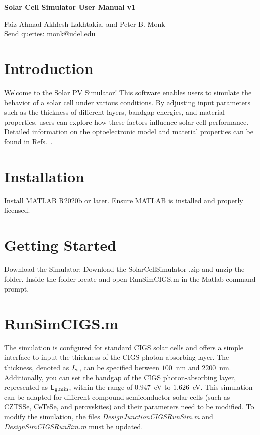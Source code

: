 \documentclass[10pt]{article}
\def\Ls{L_{\rm s}}
\def\sfE{{\sf E}}
\def\ego{\sfE_{\rm g,min}}
\def\Ls{L_{\rm s}}
\def\sfE{{\sf E}}
\def\ego{\sfE_{\rm g,min}}
\begin{document}
\begin{center}

\LARGE{ {\bf Solar Cell Simulator User Manual v1
}}
\end{center}
\begin{center}
\vspace{10mm} %

Faiz Ahmad
Akhlesh  Lakhtakia, and Peter B. Monk\\
{Send queries: monk@udel.edu}\\
\normalsize

 
\end{center}
\section{Introduction}
Welcome to the Solar PV Simulator! This software enables users to simulate the behavior of a solar cell under various conditions. By adjusting input parameters such as the thickness of different layers, bandgap energies, and material properties, users can explore how these factors influence solar cell performance. Detailed information on the optoelectronic model and material properties can be found in Refs.~\cite{Anderson2020, SolCellBook, Ahmad2022-2}.

\section{Installation}
Install MATLAB R2020b or later. Ensure MATLAB is installed and properly licensed.

\section{Getting Started}
Download the Simulator: Download the SolarCellSimulator
.zip and unzip the folder. Inside the folder locate and
open RunSimCIGS.m in the Matlab command prompt.


\section{RunSimCIGS.m}
The simulation is configured for standard CIGS solar cells and offers a simple interface to input the thickness of the CIGS photon-absorbing layer. The thickness, denoted as $\Ls$, can be specified between $100$~nm and $2200$~nm. Additionally, you can set the bandgap of the CIGS photon-absorbing layer, represented as $\ego$, within the range of $0.947$~eV to $1.626$~eV. This simulation can be adapted for different compound semiconductor solar cells (such as CZTSSe, CeTeSe, and perovskites) and their parameters need to be modified. To modify the simulation, the files \emph{DesignJunctionCIGSRunSim.m} and \emph{DesignSimCIGSRunSim.m} must be updated.
\end{document}
